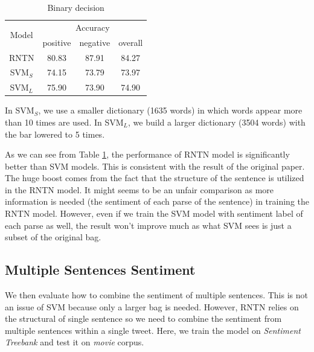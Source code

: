 \begin{table}[H]
  \begin{center}
    \begin{tabular}{cccc}\hline
      \multirow{2}{*}{Model} 
      & \multicolumn{3}{c}{Accuracy} \\\cline{2-4}
    & positive & negative & overall \\ \hline
    RNTN  & 80.83      &   87.91   &  84.27      \\ 
    SVM$_S$  & 74.15      &  73.79    &    73.97     \\ 
    SVM$_L$  & 75.90      & 73.90         &   74.90      \\ \hline
    \end{tabular}
    \end{center}
    \caption{\label{exp_1} Binary decision}
\end{table}

In SVM$_S$, we use a smaller dictionary (1635 words) in which words appear more than 10 times are used. In SVM$_L$, we build a larger dictionary (3504 words) with the bar lowered to 5 times. 

As we can see from Table \ref{exp_1}, the performance of RNTN model is significantly better than SVM models. This is consistent with the result of the original paper\cite{Socher:2013}. The huge boost comes from the fact that the structure of the sentence is utilized in the RNTN model. It might seems to be an unfair comparison as more information is needed (the sentiment of each parse of the sentence) in training the RNTN model. 
However, even if we train the SVM model with sentiment label of each parse as well, the result won't improve much as what SVM sees is just a subset of the original bag.  


\subsection{Multiple Sentences Sentiment}
We then evaluate how to combine the sentiment of multiple sentences. This is not an issue of SVM because only a larger bag is needed. However, RNTN relies on the structural of single sentence so we need to combine the sentiment from multiple sentences within a single tweet. Here, we train the model on \textit{Sentiment Treebank} and test it on \textit{movie} corpus. 

